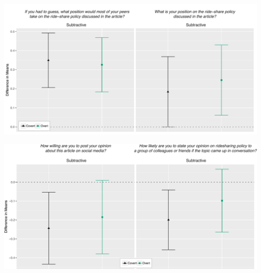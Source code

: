 \documentclass[11pt]{article}
\begin{document}
\begin{minipage}{\linewidth}
    \vspace{.5em}
    \begin{center}
        \includegraphics[width=.9\textwidth]{figures/ATE_opinion.pdf}\\
        \label{ATE_opinion}
    \end{center}
\end{minipage}

\begin{minipage}{\linewidth}
    \vspace{1em}
    \begin{center}
        \includegraphics[width=.9\textwidth]{figures/ATE_opinion_expression.pdf}\\
        \label{ATE_opinion_expression}
    \end{center}
    \vspace{1em}
\end{minipage}
\end{document}
